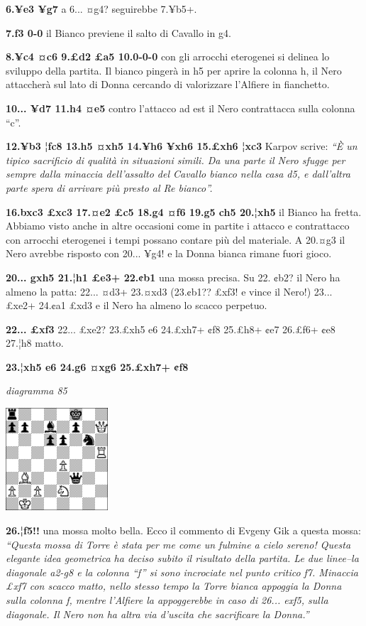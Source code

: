\documentclass[
]{article}
\begin{document}
\textbf{6.¥e3 ¥g7} a 6... ¤g4? seguirebbe 7.¥b5+.

\textbf{7.f3 0-0} il Bianco previene il salto di Cavallo in g4.

\textbf{8.¥c4 ¤c6 9.£d2 £a5 10.0-0-0} con gli arrocchi eterogenei si
delinea lo sviluppo della partita. Il bianco pingerà in h5 per aprire la
colonna h, il Nero attaccherà sul lato di Donna cercando di valorizzare
l'Alfiere in fianchetto.

\textbf{10... ¥d7 11.h4 ¤e5} contro l'attacco ad est il Nero
contrattacca sulla colonna ``c''.

\textbf{12.¥b3 ¦fc8 13.h5 ¤xh5 14.¥h6 ¥xh6 15.£xh6 ¦xc3} Karpov scrive:
\emph{``È un tipico sacrificio di qualità in situazioni simili. Da una
parte il Nero sfugge per sempre dalla minaccia dell'assalto del Cavallo
bianco nella casa d5, e dall'altra parte spera di arrivare più presto al
Re bianco''.}

\textbf{16.bxc3 £xc3 17.¤e2 £c5 18.g4 ¤f6 19.g5 ch5 20.¦xh5} il Bianco
ha fretta. Abbiamo visto anche in altre occasioni come in partite i
attacco e contrattacco con arrocchi eterogenei i tempi possano contare
più del materiale. A 20.¤g3 il Nero avrebbe risposto con 20... ¥g4! e la
Donna bianca rimane fuori gioco.

\textbf{20... gxh5 21.¦h1 £e3+ 22.¢b1} una mossa precisa. Su 22. ¢b2? il
Nero ha almeno la patta: 22... ¤d3+ 23.¤xd3 (23.¢b1?? £xf3! e vince il
Nero!) 23... £xe2+ 24.¢a1 £xd3 e il Nero ha almeno lo scacco perpetuo.

\textbf{22... £xf3} 22... £xe2? 23.£xh5 e6 24.£xh7+ ¢f8 25.£h8+ ¢e7
26.£f6+ ¢e8 27.¦h8 matto.

\textbf{23.¦xh5 e6 24.g6 ¤xg6 25.£xh7+ ¢f8}

\emph{diagramma 85}

\includegraphics[width=1.50417in,height=1.50417in]{vertopal_109f12be458a423d8f3cc838880eaea2/media/image85.png}

\textbf{26.¦f5!!} una mossa molto bella. Ecco il commento di Evgeny Gik
a questa mossa: \emph{``Questa mossa di Torre è stata per me come un
fulmine a cielo sereno! Questa elegante idea geometrica ha deciso subito
il risultato della partita. Le due linee--la diagonale a2-g8 e la
colonna ``f'' si sono incrociate nel punto critico f7. Minaccia £xf7 con
scacco matto, nello stesso tempo la Torre bianca appoggia la Donna sulla
colonna f, mentre l'Alfiere la appoggerebbe in caso di 26... exf5, sulla
diagonale. Il Nero non ha altra via d'uscita che sacrificare la
Donna.''}
\end{document}

